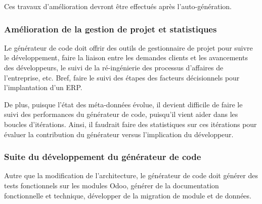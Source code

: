 



Ces travaux d’amélioration devront être effectués après l’auto-génération.

\subsubsection{Amélioration de la gestion de projet et statistiques}

Le générateur de code doit offrir des outils de gestionnaire de projet pour suivre le développement, faire la liaison entre les demandes clients et les avancements des développeurs, le suivi de la ré-ingénierie des processus d'affaires de l'entreprise, etc. Bref, faire le suivi des étapes des facteurs décisionnels pour l'implantation d'un ERP.

De plus, puisque l’état des méta-données évolue, il devient difficile de faire le suivi des performances du générateur de code, puisqu’il vient aider dans les boucles d’itérations. Ainsi, il faudrait faire des statistiques sur ces itérations pour évaluer la contribution du générateur versus l'implication du développeur.


\subsubsection{Suite du développement du générateur de code}

Autre que la modification de l'architecture, le générateur de code doit générer des tests fonctionnels sur les modules Odoo, générer de la documentation fonctionnelle et technique, développer de la migration de module et de données.


